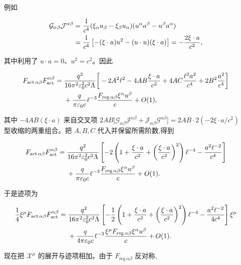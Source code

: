 例如

\begin{align*}
 \mathcal G_{\alpha\beta}\mathcal J^{\alpha\beta}
 &={1\over c^4}(\xi_\alpha u_\beta-\xi_\beta u_\alpha)
 (u^\alpha a^\beta-u^\beta a^\alpha)\\
 &={1\over c^4}\left[-(\xi\cdot a)u^2-(u\cdot u)(\xi\cdot a)\right]
 =-{2\xi\cdot a\over c^2},
\end{align*}

其中利用了 $u\cdot a=0$、$u^2=c^2$。因此

\begin{align*}
 F_{\mathrm{act}\,\alpha\beta}F_{\mathrm{act}}^{\alpha\beta}
 ={}&{q^2\over16\pi^2\varepsilon_0^2c^2\Lambda}
 \bigg[
 -2A^2\ell^2
 -4AB{\xi\cdot a\over c^2}
 +4AC{\ell^2a^2\over c^4}
 +2B^2{a^2\over c^4}
 \bigg]\\
 &+{q\over\pi\varepsilon_0c}\ell^{-3}
 {F_{\mathrm{reg}\,\alpha\beta}\xi^\alpha u^\beta\over c}
 +O(1),
\end{align*}

其中 $-4AB(\xi\cdot a)$ 来自交叉项 $2AB\bigl[\mathcal G_{\alpha\beta}\mathcal J^{\alpha\beta}+\mathcal J_{\alpha\beta}\mathcal G^{\alpha\beta}\bigr]=2AB\cdot2(-2\xi\cdot a/c^2)$ 型收缩的两重组合。把 $A,B,C$ 代入并保留所需阶数,得到

\begin{align*}
 F_{\mathrm{act}\,\alpha\beta}F_{\mathrm{act}}^{\alpha\beta}
 ={}&{q^2\over16\pi^2\varepsilon_0^2c^2\Lambda}
 \left[
 -2\left(1+{\xi\cdot a\over c^2}
 +\left({\xi\cdot a\over c^2}\right)^2\right)\ell^{-4}
 -{a^2\ell^{-2}\over c^4}
 \right]\\
 &+{q\over\pi\varepsilon_0c}\ell^{-3}
 {F_{\mathrm{reg}\,\alpha\beta}\xi^\alpha u^\beta\over c}
 +O(1).
\end{align*}

于是迹项为

\begin{align*}
 {1\over4}\xi^\mu
 F_{\mathrm{act}\,\alpha\beta}F_{\mathrm{act}}^{\alpha\beta}
 ={}&{q^2\over16\pi^2\varepsilon_0^2c^2\Lambda}
 \left[
 -{1\over2}
 \left(1+{\xi\cdot a\over c^2}
 +\left({\xi\cdot a\over c^2}\right)^2\right)\ell^{-4}
 -{a^2\ell^{-2}\over4c^4}
 \right]\xi^\mu\\
 &+{q\over4\pi\varepsilon_0c}\ell^{-3}
 {\xi^\mu F_{\mathrm{reg}\,\alpha\beta}\xi^\alpha u^\beta\over c}
 +O(1).
\end{align*}

现在把 $\mathcal X^\mu$ 的展开与迹项相加。由于 $F_{\mathrm{reg}\,\alpha\beta}$ 反对称,

